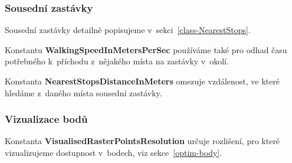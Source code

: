 \subsubsection{Sousední zastávky}

Sousední zastávky detailně popisujeme v~sekci~\ref{class-NearestStops}.

Konstantu \textbf{WalkingSpeedInMetersPerSec} používáme také pro odhad času potřebného k~příchodu z~nějakého místa na zastávky v~okolí.

Konstanta \textbf{NearestStopsDistanceInMeters} omezuje vzdálenost, ve které hledáme z~daného místa sousední zastávky.

\subsubsection{Vizualizace bodů}

Konstanta \textbf{VisualisedRasterPointsResolution} určuje rozlišení, pro které vizualizujeme dostupnost v~bodech, viz sekce~\ref{optim-body}.
